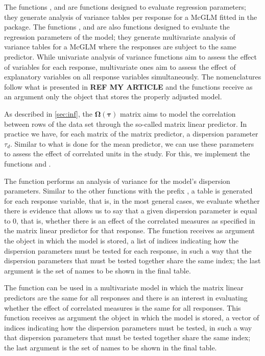 \documentclass[article]{jss}\usepackage[]{graphicx}\usepackage[]{xcolor}
\begin{document}
The functions ,  and  are functions designed to evaluate regression parameters; they generate analysis of variance tables per response for a McGLM fitted in the  package. The functions ,  and  are also functions designed to evaluate the regression parameters of the model; they generate multivariate analysis of variance tables for a McGLM where the responses are subject to the same predictor. While univariate analysis of variance functions aim to assess the effect of variables for each response, multivariate ones aim to assess the effect of explanatory variables on all response variables simultaneously. The nomenclatures follow what is presented in \textbf{REF MY ARTICLE} and the functions receive as an argument only the object that stores the properly adjusted model.

As described in \autoref{sec:inf}, the $\boldsymbol{\Omega({\tau})}$ matrix aims to model the correlation between rows of the data set through the so-called matrix linear predictor. In practice we have, for each matrix of the matrix predictor, a dispersion parameter $\tau_d$. Similar to what is done for the mean predictor, we can use these parameters to assess the effect of correlated units in the study. For this, we implement the functions  and .

The  function performs an analysis of variance for the model's dispersion parameters. Similar to the other functions with the prefix , a table is generated for each response variable, that is, in the most general cases, we evaluate whether there is evidence that allows us to say that a given dispersion parameter is equal to 0, that is, whether there is an effect of the correlated measures as specified in the matrix linear predictor for that response. The function receives as argument the object in which the model is stored, a list of indices indicating how the dispersion parameters must be tested for each response, in such a way that the dispersion parameters that must be tested together share the same index; the last argument is the set of names to be shown in the final table.

The  function can be used in a multivariate model in which the matrix linear predictors are the same for all responses and there is an interest in evaluating whether the effect of correlated measures is the same for all responses. This function receives as argument the object in which the model is stored, a vector of indices indicating how the dispersion parameters must be tested, in such a way that dispersion parameters that must be tested together share the same index; the last argument is the set of names to be shown in the final table.
\end{document}
